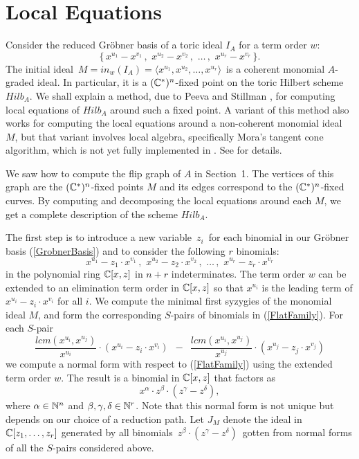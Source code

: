 \section{Local Equations}
Consider the reduced Gr\"obner basis of a toric ideal $I_A$ for a
term order $w$:
\begin{equation}
\label{GrobnerBasis} \bigl\{ \,
 x^{u_1} -  x^{v_1} \, , \,\, x^{u_2} -  x^{v_2} \,, \,\, \ldots \, , \,\,
x^{u_r} -  x^{v_r}\, \bigr\} .
\end{equation}
The initial ideal $\,M = in_w(I_A) = \langle x^{u_1}, x^{u_2}, \ldots,
x^{u_r} \rangle \,$ is a coherent monomial $A$-graded ideal. In
particular, it is a $(\mathbb{C}^*)^n$-fixed point on the toric Hilbert scheme
$Hilb_A$.  We shall explain a method, due to Peeva and Stillman
\cite{HS:PS2}, for computing local equations of $Hilb_A$ around such a
fixed point.  A variant of this method also works for computing the
local equations around a non-coherent monomial ideal $M$, but that
variant involves local algebra, specifically Mora's tangent cone
algorithm, which is not yet fully implemented in \Mtwo. See \cite{HS:PS2}
for details.

We saw how to compute the flip graph of $A$ in Section~1. The vertices
of this graph are the $(\mathbb{C}^*)^n$-fixed points $M$ and its edges
correspond to the $(\mathbb{C}^*)^n$-fixed curves.  By computing and
decomposing the local equations around each $M$, we get a complete
description of the scheme $Hilb_A$.

The first step is to introduce a new variable $ \, z_i \,$ for each 
binomial in our Gr\"obner basis (\ref{GrobnerBasis}) and to consider 
the following $r$ binomials:
\begin{equation}
\label{FlatFamily}
 x^{u_1} -  z_1 \cdot x^{v_1} \,, \,\,
 x^{u_2} - z_2  \cdot x^{v_2} \,,\, \, \ldots \, ,
\,\, x^{u_r} -   z_r \cdot x^{v_r} 
\end{equation}
in the polynomial ring $\mathbb{C}[x,z]$ in  $n+r$ indeterminates.
The term order $w$ can be extended to an elimination term order
in $\mathbb{C}[x,z]$ so that $x^{u_i}$ is the leading term of
$ x^{u_i} -  z_i \cdot x^{v_i} $ for all $i$. 
We compute the minimal first syzygies
of the monomial ideal $M$, and form the
corresponding $S$-pairs of binomials in (\ref{FlatFamily}).
For each $S$-pair
$$
\frac{lcm(x^{u_i},x^{u_j})}{x^{u_i}} \cdot (x^{u_i} - z_i \cdot
x^{v_i} ) \,\,\, - \,\,\, \frac{lcm(x^{u_i},x^{u_j})}{x^{u_j}} \cdot
(x^{u_j} - z_j \cdot x^{v_j}) $$
we compute a normal form with respect
to (\ref{FlatFamily}) using the extended term order $w$.  The result
is a binomial in $\mathbb{C}[x,z]$ that factors as 
$$  x^\alpha \cdot z^\beta \cdot  ( z^\gamma - z^\delta ) , $$
where $\alpha \in \mathbb{N}^n$ and $\beta,\gamma,\delta \in \mathbb{N}^r$.
Note that this normal form is not unique but depends on our
choice of a reduction path.
Let $J_M$ denote the ideal in $\mathbb{C}[z_1 , \ldots, z_r]$ generated by all 
binomials $\, z^\beta \cdot  ( z^\gamma - z^\delta ) \,$
gotten from normal forms of all the $S$-pairs considered above.

